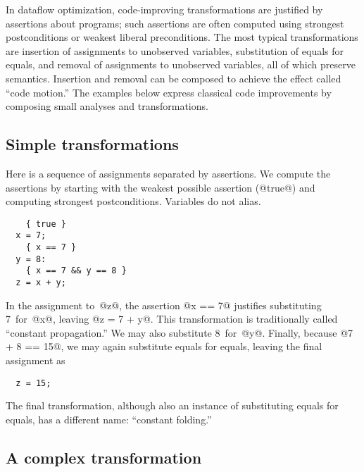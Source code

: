 \documentclass[blockstyle,preprint,natbib,nocopyrightspace]{sigplanconf}
\newcommand\naive{na\"\i ve}
\newcommand{\authornote}[1]{{\em #1}}
\def\authornote#1{\unskip\relax}
\newcommand{\norman}[1]{\authornote{NR: #1}}
\let\remark\norman
\newcommand\seclabel[1]{\label{sec:#1}}
\begin{document}
\seclabel{example:transforms}
\seclabel{example:xforms}

In dataflow optimization, code-improving transformations are justified
by assertions about programs;
such assertions are often computed using
strongest postconditions or weakest liberal preconditions.
The most typical transformations are
insertion of assignments to unobserved variables,
substitution of equals for equals, 
and
removal of assignments to unobserved variables,
all of which preserve semantics.
Insertion and removal can be composed to achieve the effect called
``code motion.''
The examples below express classical code
improvements by composing small analyses and transformations.



\ifpagetuning \enlargethispage{1\baselineskip} \fi 

\subsection{Simple transformations}

\seclabel{constant-propagation}

Here is a sequence of assignments separated by assertions.
We compute the assertions by starting with the weakest possible
assertion (@true@) and computing strongest postconditions.
{Variables do not alias.}
\begin{verbatim}
    { true }
  x = 7;
    { x == 7 }
  y = 8: 
    { x == 7 && y == 8 }
  z = x + y;
\end{verbatim}
\remark{SLPJ asks: Could we add $x=7,y=8,z=15$ as a final assertion?
We can but we should not, because a \naive\ sp function 
would produce the assertion $x=7\land y = 8
\land z = x+y$. To reach the point you desire, some sort of simplifier
would be required, and it is better to let the conclusion emerge
naturally as  the code is rewritten.}
In the assignment to~@z@, the assertion @x == 7@ justifies
substituting 7~for~@x@, leaving @z = 7 + y@.  
This transformation is traditionally called ``constant propagation.''
We may also substitute 8~for~@y@.
Finally, because @7 + 8 == 15@, we may again substitute equals for
equals, leaving the final assignment as
\begin{verbatim}
  z = 15;
\end{verbatim}
The final transformation, although also an instance of substituting equals
for equals, has a different name: ``constant folding.''

\subsection{A complex transformation}
\end{document}
